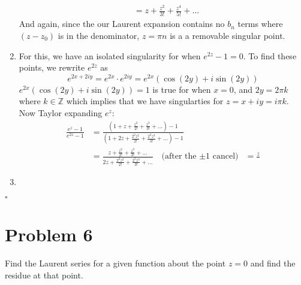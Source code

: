 \documentclass[11pt]{article}
\newcommand{\Z}{\mathbb{Z}}
\newenvironment{proof}{\noindent{\bf Proof.}}{\hfill $\square$\medskip}
\begin{document}
\begin{proof}
\begin{enumerate}[label=\textbf{(\alph*)}]
\begin{equation}
\begin{split}
                      &=z+\frac{z^{2}}{3!}+\frac{z^{4}}{5!}+...
                  \end{split}
              \end{equation}
              And again, since the our Laurent expansion contains no $b_{n}$ terms where $(z-z_{0})$ is in the denominator, $z=\pi n$ is a a removable singular point.
        \item For this, we have an isolated singularity for when $e^{2z}-1=0$. To find these points, we rewrite $e^{2z}$ as
              $$e^{2x+2iy}=e^{2x}\cdot e^{2iy}=e^{2x}\left(\cos(2y)+i\sin(2y)\right)$$
              $e^{2x}\left(\cos(2y)+i\sin(2y)\right)=1$ is true for when $x=0$, and $2y=2\pi k$ where $k\in\Z$ which implies that we have singularties for $z=x+iy=i\pi k$. Now Taylor expanding $e^{z}$:
              \begin{equation}
                  \begin{split}
                      \frac{e^{z}-1}{e^{2z}-1}&=\frac{\left(1+z+\frac{z^{2}}{2!}+\frac{z^{3}}{3!}+...\right)-1}{\left(1+2z+\frac{2^{2}z^{2}}{2!}+\frac{2^{3}z^{3}}{3!}+...\right)-1}\\
                      &=\frac{z+\frac{z^{2}}{2!}+\frac{z^{3}}{3!}+...}{2z+\frac{2^{2}z^{2}}{2!}+\frac{2^{3}z^{3}}{3!}+...}\quad\text{(after the $\pm 1$ cancel)}
                      &=\frac{z}{}
                  \end{split}
              \end{equation}
        \item
    \end{enumerate}
\end{proof}


\newpage
\section{Problem 6}
Find the Laurent series for a given function about the point $z=0$ and find the residue at that point.
\end{document}
